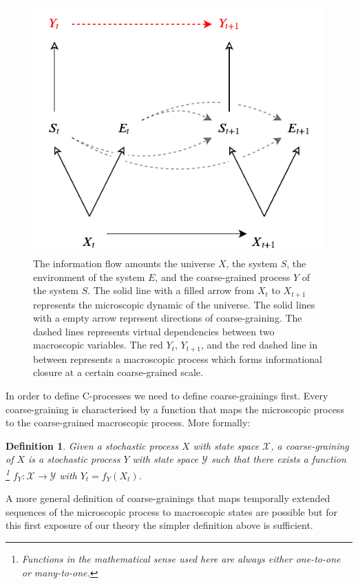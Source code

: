 \documentclass[utf8]{article}
\newtheorem{definition}{Definition}
\begin{document}
        
		\begin{figure}[H]
		    \centering
			\includegraphics[width=\textwidth]{WritingMaterials/Fig_FullGraph/FullGraph.pdf}
			\caption{The information flow amounts the universe $X$, the system $S$, the environment of the system $E$, and the coarse-grained process $Y$ of the system $S$. The solid line with a filled arrow from $X_t$ to $X_{t+1}$ represents the microscopic dynamic of the universe. The solid lines with a empty arrow represent directions of coarse-graining. The dashed lines represents virtual dependencies between  two macroscopic variables. The red $Y_t$, $Y_{t+1}$, and the red dashed line in between represents a macroscopic process which forms informational closure at a certain coarse-grained scale.}
			\label{fig:fullgraph}
	   	\end{figure}

	   	In order to define C-processes we need to define coarse-grainings first. Every coarse-graining is characterised by a function that maps the microscopic process to the coarse-grained macroscopic process. More formally: 
	   	
	   	\begin{definition}
	   	 Given a stochastic process $X$ with state space $\mathcal{X}$, a \emph{coarse-graining of $X$} is a stochastic process $Y$ with state space $\mathcal{Y}$ such that there exists a function \footnote{Functions in the mathematical sense used here are always either one-to-one or many-to-one.} $f_Y:\mathcal{X}\rightarrow \mathcal{Y}$ with $Y_t=f_Y(X_t)$.  
	   	\end{definition}
	   	A more general definition of coarse-grainings that maps temporally extended sequences of the microscopic process to macroscopic states are possible but for this first exposure of our theory the simpler definition above is sufficient. 
	   	
\end{document}
